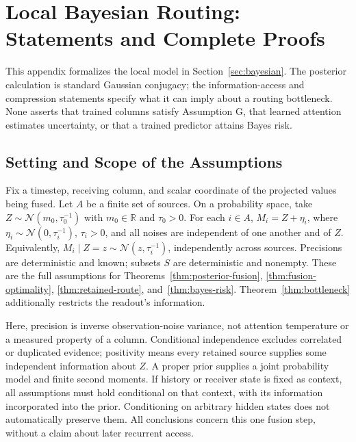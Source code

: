\section{Local Bayesian Routing: Statements and Complete Proofs}\label{app:bayesian}

This appendix formalizes the local model in Section~\ref{sec:bayesian}. The posterior calculation is standard Gaussian conjugacy; the information-access and compression statements specify what it can imply about a routing bottleneck. None asserts that trained columns satisfy Assumption G, that learned attention estimates uncertainty, or that a trained predictor attains Bayes risk.

\ifdefined\mosaicbayesinappendix\fi

\subsection{Setting and Scope of the Assumptions}

Fix a timestep, receiving column, and scalar coordinate of the projected values being fused. Let $A$ be a finite set of sources. On a probability space, take $Z\sim\mathcal{N}(m_0,\tau_0^{-1})$ with $m_0\in\mathbb{R}$ and $\tau_0>0$. For each $i\in A$, $M_i=Z+\eta_i$, where $\eta_i\sim\mathcal{N}(0,\tau_i^{-1})$, $\tau_i>0$, and all noises are independent of one another and of $Z$. Equivalently, $M_i\mid Z=z\sim\mathcal{N}(z,\tau_i^{-1})$, independently across sources. Precisions are deterministic and known; subsets $S$ are deterministic and nonempty. These are the full assumptions for Theorems~\ref{thm:posterior-fusion}, \ref{thm:fusion-optimality}, \ref{thm:retained-route}, and~\ref{thm:bayes-risk}. Theorem~\ref{thm:bottleneck} additionally restricts the readout's information.

Here, precision is inverse observation-noise variance, not attention temperature or a measured property of a column. Conditional independence excludes correlated or duplicated evidence; positivity means every retained source supplies some independent information about $Z$. A proper prior supplies a joint probability model and finite second moments. If history or receiver state is fixed as context, all assumptions must hold conditional on that context, with its information incorporated into the prior. Conditioning on arbitrary hidden states does not automatically preserve them. All conclusions concern this one fusion step, without a claim about later recurrent access.

